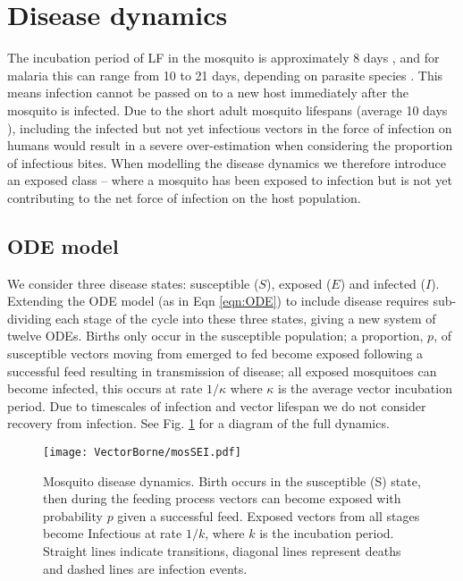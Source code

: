 \section{Disease dynamics}

The incubation period of LF in the mosquito is approximately 8 days \cite{le2007,erickson2009}, and for malaria this can range from 10 to 21 days, depending on parasite species \cite{CDCMalaria}. This means infection cannot be passed on to a new host immediately after the mosquito is infected. Due to the short adult mosquito lifespans (average 10 days \cite{le2007}), including the infected but not yet infectious vectors in the force of infection on humans would result in a severe over-estimation when considering the proportion of infectious bites. When modelling the disease dynamics we therefore introduce an exposed class -- where a mosquito has been exposed to infection but is not yet contributing to the net force of infection on the host population.

\subsection{ODE model}

We consider three disease states: susceptible ($S$), exposed ($E$) and infected ($I$). Extending the ODE model (as in Eqn \ref{eqn:ODE}) to include disease requires sub-dividing each stage of the cycle into these three states, giving a new system of twelve ODEs. Births only occur in the susceptible population; a proportion, $p$, of susceptible vectors moving from emerged to fed become exposed following a successful feed resulting in transmission of disease; all exposed mosquitoes can become infected, this occurs at rate $1/\kappa$ where $\kappa$ is the average vector incubation period. Due to timescales of infection and vector lifespan we do not consider recovery from infection. See Fig. \ref{fig:diag_vec_SEI} for a diagram of the full dynamics.

\begin{figure}[h]
\begin{center}
\texttt{[image: VectorBorne/mosSEI.pdf]}
\caption{Mosquito disease dynamics. Birth occurs in the susceptible (S) state, then during the feeding process vectors can become exposed with probability $p$ given a successful feed. Exposed vectors from all stages become Infectious at rate $1/k$, where $k$ is the incubation period. Straight lines indicate transitions, diagonal lines represent deaths and dashed lines are infection events.}
\label{fig:diag_vec_SEI}
\end{center}
\end{figure}

